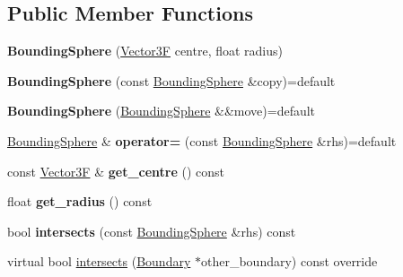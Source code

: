 \subsection*{Public Member Functions}
\begin{DoxyCompactItemize}
\item 
\mbox{\label{class_bounding_sphere_a9d6fd19a13a3ec6106254640591a26b8}} 
{\bfseries Bounding\+Sphere} (\mbox{\hyperlink{class_vector3}{Vector3F}} centre, float radius)
\item 
\mbox{\label{class_bounding_sphere_a7c9b518f0f0a9656e9efa861f5e6ee9d}} 
{\bfseries Bounding\+Sphere} (const \mbox{\hyperlink{class_bounding_sphere}{Bounding\+Sphere}} \&copy)=default
\item 
\mbox{\label{class_bounding_sphere_a1f5065e1481dcfd002a50b5fed5f5e6a}} 
{\bfseries Bounding\+Sphere} (\mbox{\hyperlink{class_bounding_sphere}{Bounding\+Sphere}} \&\&move)=default
\item 
\mbox{\label{class_bounding_sphere_ad77f5db8cff86f6009e0d23604b912f3}} 
\mbox{\hyperlink{class_bounding_sphere}{Bounding\+Sphere}} \& {\bfseries operator=} (const \mbox{\hyperlink{class_bounding_sphere}{Bounding\+Sphere}} \&rhs)=default
\item 
\mbox{\label{class_bounding_sphere_a8d81f5c646d752821c356742819ff512}} 
const \mbox{\hyperlink{class_vector3}{Vector3F}} \& {\bfseries get\+\_\+centre} () const
\item 
\mbox{\label{class_bounding_sphere_a5049afba6967afbd35f3e18d82a51acd}} 
float {\bfseries get\+\_\+radius} () const
\item 
\mbox{\label{class_bounding_sphere_aea072dbeaec73a4738dd7adf496a11ae}} 
bool {\bfseries intersects} (const \mbox{\hyperlink{class_bounding_sphere}{Bounding\+Sphere}} \&rhs) const
\item 
virtual bool \mbox{\hyperlink{class_bounding_sphere_aab64d759fac6a9835ac24d6fca8530d6}{intersects}} (\mbox{\hyperlink{class_boundary}{Boundary}} $\ast$other\+\_\+boundary) const override
\end{DoxyCompactItemize}


